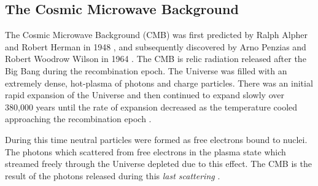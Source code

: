 \subsection{The Cosmic Microwave Background}\label{sec:DMOverview/CMB}
The Cosmic Microwave Background (CMB) was first predicted by Ralph Alpher and Robert Herman in 1948 \cite{CMBprediction}, and subsequently discovered by Arno Penzias and Robert Woodrow Wilson in 1964 \cite{CMBDisco}. The CMB is relic radiation released after the Big Bang during the recombination epoch. The Universe was filled with an extremely dense, hot-plasma of photons and charge particles. There was an initial rapid expansion of the Universe and then continued to expand slowly over 380,000 years until the rate of expansion decreased as the temperature cooled approaching the recombination epoch \cite{DMPrimer}. 

During this time neutral particles were formed as free electrons bound to nuclei. The photons which scattered from free electrons in the plasma state which streamed freely through the Universe depleted due to this effect. The CMB is the result of the photons released during this \textit{last scattering} \cite{Cirelli:2024ssz}.

